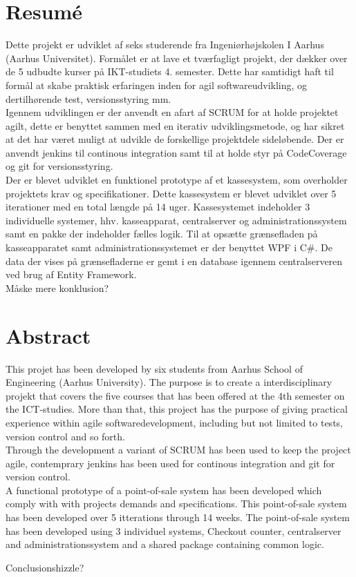 \section*{Resumé}
Dette projekt er udviklet af seks studerende fra Ingeniørhøjskolen I Aarhus (Aarhus Universitet). Formålet er at lave et tværfagligt projekt, der dækker over de 5 udbudte kurser på IKT-studiets 4. semester. Dette har samtidigt haft til formål at skabe praktisk erfaringen inden for agil softwareudvikling, og dertilhørende test, versionsstyring mm.\\
Igennem udviklingen er der anvendt en afart af SCRUM for at holde projektet agilt, dette er benyttet sammen med en iterativ udviklingsmetode, og har sikret at det har været muligt at udvikle de forskellige projektdele sideløbende. Der er anvendt jenkins til continous integration samt til at holde styr på CodeCoverage og git for versionsstyring. \\
Der er blevet udviklet en funktionel prototype af et kassesystem, som overholder projektets krav og specifikationer. Dette kassesystem er blevet udviklet over 5 iterationer med en total længde på 14 uger. Kassesystemet indeholder 3 individuelle systemer, hhv. kasseapparat, centralserver og administrationssystem samt en pakke der indeholder fælles logik. 
Til at opsætte grænsefladen på kasseapparatet samt administrationssystemet er der benyttet WPF i C\#. De data der vises på grænsefladerne er gemt i en database igennem centralserveren ved brug af Entity Framework. \\
Måske mere konklusion?


\section*{Abstract}
This projet has been developed by six students from Aarhus School of Engineering (Aarhus University). The purpose is to create a interdisciplinary projekt that covers the five courses that has been offered at the 4th semester on the ICT-studies. More than that, this project has the purpose of giving practical experience within agile softwaredevelopment, including but not limited to tests, version control and so forth.\\
Through the development a variant of SCRUM has been used to keep the project agile, contemprary jenkins has been used for continous integration and git for version control.\\
A functional prototype of a point-of-sale system has been developed which comply with with projects demands and specifications. This point-of-sale system has been developed over 5 itterations through 14 weeks. The point-of-sale system has been developed using 3 individuel systems, Checkout counter, centralserver and administrationssystem and a shared package containing common logic.

Conclusionshizzle?